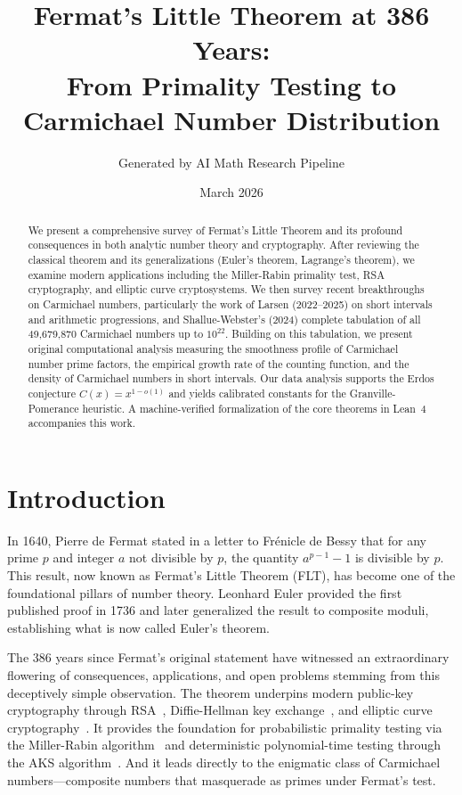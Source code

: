 \documentclass{amsart}
\title{Fermat's Little Theorem at 386 Years:\\ From Primality Testing to Carmichael Number Distribution}
\author{Generated by AI Math Research Pipeline}
\date{March 2026}
\theoremstyle{plain}
\theoremstyle{definition}
\theoremstyle{remark}
\begin{document}
\begin{abstract}
We present a comprehensive survey of Fermat's Little Theorem and its profound consequences in both analytic number theory and cryptography. After reviewing the classical theorem and its generalizations (Euler's theorem, Lagrange's theorem), we examine modern applications including the Miller-Rabin primality test, RSA cryptography, and elliptic curve cryptosystems. We then survey recent breakthroughs on Carmichael numbers, particularly the work of Larsen (2022--2025) on short intervals and arithmetic progressions, and Shallue-Webster's (2024) complete tabulation of all 49,679,870 Carmichael numbers up to $10^{22}$. Building on this tabulation, we present original computational analysis measuring the smoothness profile of Carmichael number prime factors, the empirical growth rate of the counting function, and the density of Carmichael numbers in short intervals. Our data analysis supports the Erdos conjecture $C(x) = x^{1-o(1)}$ and yields calibrated constants for the Granville-Pomerance heuristic. A machine-verified formalization of the core theorems in Lean~4 accompanies this work.
\end{abstract}

\maketitle

\tableofcontents

\section{Introduction}

In 1640, Pierre de Fermat stated in a letter to Fr\'enicle de Bessy that for any prime $p$ and integer $a$ not divisible by $p$, the quantity $a^{p-1} - 1$ is divisible by $p$. This result, now known as Fermat's Little Theorem (FLT), has become one of the foundational pillars of number theory. Leonhard Euler provided the first published proof in 1736 and later generalized the result to composite moduli, establishing what is now called Euler's theorem.

The 386 years since Fermat's original statement have witnessed an extraordinary flowering of consequences, applications, and open problems stemming from this deceptively simple observation. The theorem underpins modern public-key cryptography through RSA~\cite{rsa1978}, Diffie-Hellman key exchange~\cite{diffiehellman1976}, and elliptic curve cryptography~\cite{washington2008}. It provides the foundation for probabilistic primality testing via the Miller-Rabin algorithm~\cite{rabin1980} and deterministic polynomial-time testing through the AKS algorithm~\cite{aks2004}. And it leads directly to the enigmatic class of Carmichael numbers---composite numbers that masquerade as primes under Fermat's test.
\end{document}
